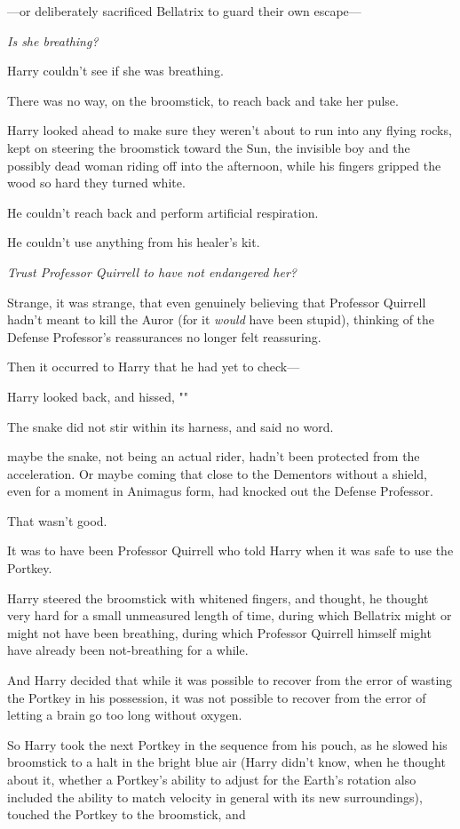 ---or deliberately sacrificed Bellatrix to guard their own escape---

\emph{Is she breathing?}

Harry couldn't see if she was breathing.

There was no way, on the broomstick, to reach back and take her pulse.

Harry looked ahead to make sure they weren't about to run into any flying
rocks, kept on steering the broomstick toward the Sun, the invisible boy and
the possibly dead woman riding off into the afternoon, while his fingers
gripped the wood so hard they turned white.

He couldn't reach back and perform artificial respiration.

He couldn't use anything from his healer's kit.

\emph{Trust Professor Quirrell to have not endangered her?}

Strange, it was strange, that even genuinely believing that Professor Quirrell
hadn't meant to kill the Auror (for it \emph{would} have been stupid), thinking
of the Defense Professor's reassurances no longer felt reassuring.

Then it occurred to Harry that he had yet to check---

Harry looked back, and hissed, ""

The snake did not stir within its harness, and said no word.

{\el} maybe the snake, not being an actual rider, hadn't been protected from
the acceleration. Or maybe coming that close to the Dementors without a shield,
even for a moment in Animagus form, had knocked out the Defense Professor.

That wasn't good.

It was to have been Professor Quirrell who told Harry when it was safe to use
the Portkey.

Harry steered the broomstick with whitened fingers, and thought, he thought
very hard for a small unmeasured length of time, during which Bellatrix might
or might not have been breathing, during which Professor Quirrell himself might
have already been not-breathing for a while.

And Harry decided that while it was possible to recover from the error of
wasting the Portkey in his possession, it was not possible to recover from the
error of letting a brain go too long without oxygen.

So Harry took the next Portkey in the sequence from his pouch, as he slowed his
broomstick to a halt in the bright blue air (Harry didn't know, when he thought
about it, whether a Portkey's ability to adjust for the Earth's rotation also
included the ability to match velocity in general with its new surroundings),
touched the Portkey to the broomstick, and{\el}

